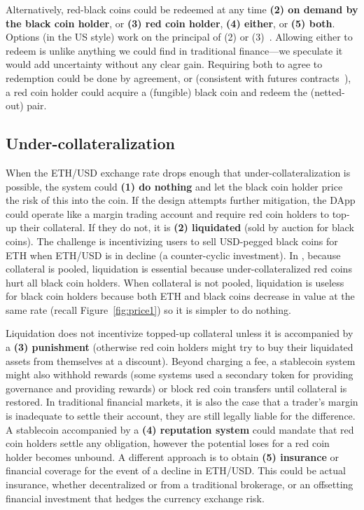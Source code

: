Alternatively, red-black coins could be redeemed at any time \textbf{(2) on demand by the black coin holder}, or \textbf{(3) red coin holder}, \textbf{(4) either}, or \textbf{(5) both}. Options (in the US style) work on the principal of (2) or (3)~\cite{Har03,Sey09}. Allowing either to redeem is unlike anything we could find in traditional finance---we speculate it would add uncertainty without any clear gain. Requiring both to agree to redemption could be done by agreement, or (consistent with futures contracts~\cite{Har03}), a red coin holder could acquire a (fungible) black coin and redeem the (netted-out) pair.


\subsection{Under-collateralization}

When the ETH/USD exchange rate drops enough that under-collateralization is possible, the system could \textbf{(1) do nothing} and let the black coin holder price the risk of this into the coin. If the design attempts further mitigation, the DApp could operate like a margin trading account and require red coin holders to top-up their collateral. If they do not, it is \textbf{(2) liquidated} (\eg sold by auction for black coins). The challenge is incentivizing users to sell USD-pegged black coins for ETH when ETH/USD is in decline (a counter-cyclic investment). In \dai, because collateral is pooled, liquidation is essential because under-collateralized red coins hurt all black coin holders. When collateral is not pooled, liquidation is useless for black coin holders because both ETH and black coins decrease in value at the same rate (recall Figure~\ref{fig:price1}) so it is simpler to do nothing.

Liquidation does not incentivize topped-up collateral unless it is accompanied by a \textbf{(3) punishment} (otherwise red coin holders might try to buy their liquidated assets from themselves at a discount). Beyond charging a fee, a stablecoin system might also withhold rewards (some systems used a secondary token for providing governance and providing rewards) or block red coin transfers until collateral is restored. In traditional financial markets, it is also the case that a trader's margin is inadequate to settle their account, they are still legally liable for the difference. A stablecoin accompanied by a \textbf{(4) reputation system} could mandate that red coin holders settle any obligation, however the potential loses for a red coin holder becomes unbound. A different approach is to obtain \textbf{(5) insurance} or financial coverage for the event of a decline in ETH/USD. This could be actual insurance, whether decentralized or from a traditional brokerage, or an offsetting financial investment that hedges the currency exchange risk. %

